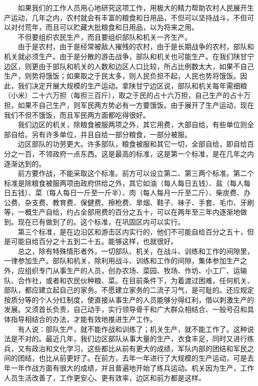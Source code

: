 \documentclass[cn,11pt,chinese]{elegantbook}
\begin{document}
　　如果我们的工作人员用心地研究这项工作，用极大的精力帮助农村人民展开生产运动，几年之内，农村就会有丰富的粮食和日用品，不但可以坚持战斗，不但可以对付荒年，而且可以贮藏大批粮食和日用品，以为将来之用。\\
　　不但要组织农民生产，而且要组织部队和机关一齐生产。\\
　　由于是农村，由于是经常被敌人摧残的农村，由于是长期战争的农村，部队和机关就必须生产。由于是分散的游击战争，部队和机关也可能生产。在我们陕甘宁边区，则更由于部队和机关的人数和边区人口比较，所占比例数太大，如果不自己生产，则势将饿饭；如果取之于民太多，则人民负担不起，人民也势将饿饭。因此，我们决定开展大规模的生产运动。拿陕甘宁边区说，部队和机关每年需细粮（小米）二十六万担（每担三百斤），取之于民的占十六万担，自己生产的占十万担，如果不自己生产，则军民两方势必有一方要饿饭。由于展开了生产运动，现在我们不但不饿饭，而且军民两方面都吃得很好。\\
　　我们边区的机关，除粮食被服两项之外，其它用费，大部自给，有些单位则全部自给。另有许多单位，并且自给一部分粮食，一部分被服。\\
　　边区部队的功劳更大。许多部队，粮食被服和其它一切，全部自给，即自给百分之一百，不领政府一点东西。这是最高的标准，这是第一个标准，是在几年之内逐渐达到的。\\
　　前方要作战，不能采取这个标准。前方可以设立第二、第三两个标准。第二个标准是除粮食被服两项由政府供给之外，其它如油（每人每日五钱）、盐（每人每日五钱）、菜（每人每日一斤至一斤半）、肉（每人每月一斤至二斤）、柴炭费、办公费、杂支费、教育费、保健费、擦枪费、旱烟、鞋子、袜子、手套、毛巾、牙刷等，一概生产自给，约占全部用费的百分之五十，可以在两年至三年内逐渐地做到。现在已有做到了的。这个标准，在巩固区内可以实行。\\
　　第三个标准，是在边沿区和游击区内实行的，他们不可能自给百分之五十，但是可能自给百分之十五到二十五。能够这样，也就很好。\\
　　总之，除有特殊情形者外，一切部队、机关，在战斗、训练和工作的间隙里，一律参加生产。部队和机关，除利用战斗、训练和工作的间隙，集体参加生产之外，应组织专门从事生产的人员，创办农场、菜园、牧场、作坊、小工厂、运输队、合作社，或者和农民伙种粮、菜。在目前条件下，为着渡过困难，任何机关、部队，都应建立起自己的家务。不愿建立家务的二流子习气，是可耻的。还应规定按质分等的个人分红制度，使直接从事生产的人员能够分得红利，借以刺激生产的发展。又须首长负责，自己动手，实行领导骨干和广大群众相结合、一般号召和具体指导相结合的办法，才能有效地推进生产工作。\\
　　有人说：部队生产，就不能作战和训练了；机关生产，就不能工作了。这种说法是不对的。最近几年，我们边区部队从事大量的生产，衣食丰足，同时又进行练兵，又有政治和文化学习，这些都比从前有更大的成绩，军队内部的团结和军民之间的团结，也比从前更好了。在前方，去年一年进行了大规模的生产运动，可是去年一年作战方面有很大的成绩，并且普遍地开始了练兵运动。机关因为生产，工作人员生活改善了，工作更安心、更有效率，边区和前方都是这样。\\
\end{document}
